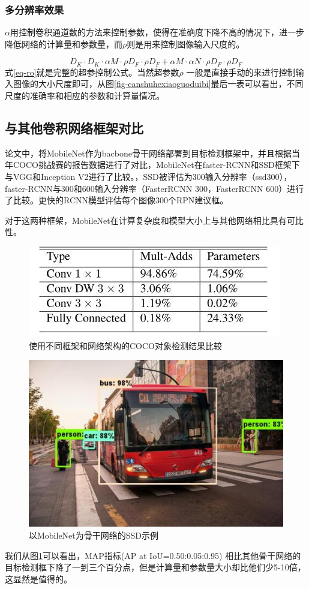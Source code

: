 \documentclass[UTF8,a4paper,12pt]{ctexart}
\begin{document}
\subsubsection{多分辨率效果}
$\alpha$用控制卷积通道数的方法来控制参数，使得在准确度下降不高的情况下，进一步降低网络的计算量和参数量，而$\rho$则是用来控制图像输入尺度的。

\begin{equation}
	D_{K} \cdot D_{K} \cdot \alpha M \cdot \rho D_{F} \cdot \rho D_{F}+\alpha M \cdot \alpha N \cdot \rho D_{F} \cdot \rho D_{F}
	\label{eq-ro}
\end{equation}
式\ref{eq-ro}就是完整的超参控制公式。当然超参数$\rho$ 一般是直接手动的来进行控制输入图像的大小尺度即可，从图\ref{fig-canshuhexiaoguoduibi}最后一表可以看出，不同尺度的准确率和相应的参数和计算量情况。 

\subsection{与其他卷积网络框架对比}


 
论文中，将MobileNet作为bacbone骨干网络部署到目标检测框架中，并且根据当年COCO挑战赛的报告数据进行了对比，MobileNet在faster-RCNN\cite{23}和SSD\cite{21}框架下与VGG和Inception V2\cite{13}进行了比较。，SSD被评估为300输入分辨率（ssd300），faster-RCNN与300和600输入分辨率（FasterRCNN 300，FasterRCNN 600）进行了比较。更快的RCNN模型评估每个图像300个RPN建议框。

对于这两种框架，MobileNet在计算复杂度和模型大小上与其他网络相比具有可比性。
 
\begin{figure}[htbp]
	\centering
	\includegraphics[width=0.5\linewidth]{webmin/计算量对比.jpg}
	\caption{使用不同框架和网络架构的COCO对象检测结果比较}
	\label{fig-mubiaokuangjiaduibi}
\end{figure}

\begin{figure}[htbp]
	\centering
	\includegraphics[width=0.5\linewidth]{webmin/ssd示例.jpg}
	\caption{以MobileNet为骨干网络的SSD示例}
	\label{fig-ssd}
\end{figure}
我们从图\ref{fig-mubiaokuangjiaduibi}可以看出，MAP指标(AP at IoU=0.50:0.05:0.95) 相比其他骨干网络的目标检测框下降了一到三个百分点，但是计算量和参数量大小却比他们少5-10倍，这显然是值得的。
 
\end{document}
